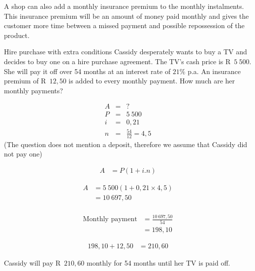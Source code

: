 A shop can also add a monthly insurance premium to the monthly instalments. This insurance premium will be an amount of money paid monthly and gives the customer more time between a missed payment and possible repossession of the product.


\begin{wex}{Hire purchase with extra conditions}{
    Cassidy desperately wants to buy a TV and decides to buy one on a hire purchase agreement. The TV’s cash price is R~$5~500$. She will pay it off over 54 months at an interest rate of $21\%$ p.a. An insurance premium of R~$12,50$ is added to every monthly payment. How much are her monthly payments?}{

    \begin{eqnarray*}
	A &=& ?\\
	P &=& 5~500\\
	i &=& 0,21\\
	n &=& \frac{54}{12} = 4,5
    \end{eqnarray*}
(The question does not mention a deposit, therefore we assume that Cassidy did not pay one)

    \begin{align*}
	    A &= P(1 + i . n)
    \end{align*}

    \begin{align*}
	A &= 5~500(1 + 0,21 \times 4,5)\\
	  &= 10~697,50\\
    \end{align*}

    \begin{align*}
	\text{Monthly payment} &= \frac{10~697,50}{54}\\
			&= 198,10
    \end{align*}

    \begin{align*}
	198,10 + 12,50 &= 210,60
    \end{align*}

    Cassidy will pay R~$210,60$ monthly for 54 months until her TV is paid off.
}
\end{wex}




